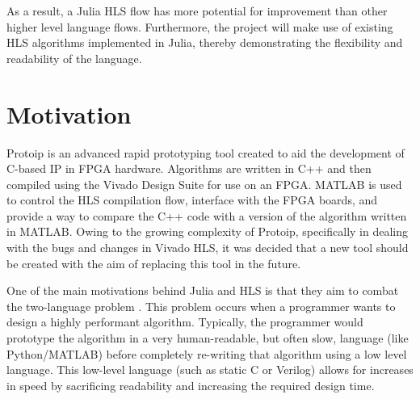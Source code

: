As a result, a Julia HLS flow has more potential for improvement than other higher level language flows. Furthermore, the project will make use of existing HLS algorithms implemented in Julia, thereby demonstrating the flexibility and readability of the language.

\iffalse
whats new and interesting??

- Similar project in julia include Julia for GPUs and distributed processors
- These target the LLVM layer, we want to use the typed IR to abstract some of the functionality, avoid writing LLVM
- Most HLS projects uses subsets of C or C++ and again use compiled LLVM layer as input to HLS, Julia is a higher level language than C++ - existing python hls flow but this lacks the language optimisations that julia can do.
- algorithms will be similar to existing hls flows but there is novelty in implementing them in julia and seeing how effective julia is at optimizing these algorithms
- julia has optimised methods and libraries that will aid development
- want to see hwo versatile julia is, is it easier to develop this flow than python flow?
\fi 


\section{Motivation}
Protoip \cite{protoip} is an advanced rapid prototyping tool created to aid the development of C-based IP in FPGA hardware. Algorithms are written in C++ and then compiled using the Vivado Design Suite for use on an FPGA. MATLAB is used to control the HLS compilation flow, interface with the FPGA boards, and provide a way to compare the C++ code with a version of the algorithm written in MATLAB. Owing to the growing complexity of Protoip, specifically in dealing with the bugs and changes in Vivado HLS, it was decided that a new tool should be created with the aim of replacing this tool in the future. 

One of the main motivations behind Julia and HLS is that they aim to combat the two-language problem \cite{julia_intro}. This problem occurs when a programmer wants to design a highly performant algorithm. Typically, the programmer would prototype the algorithm in a very human-readable, but often slow, language (like Python/MATLAB) before completely re-writing that algorithm using a low level language. This low-level language (such as static C or Verilog) allows for increases in speed by sacrificing readability and increasing the required design time.

